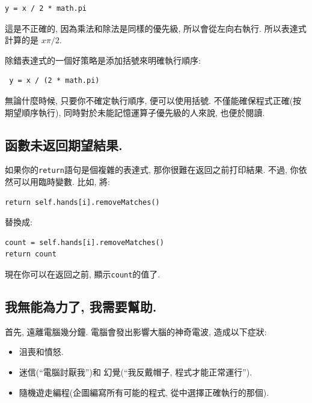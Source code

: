 \documentclass[10pt]{book}
\begin{document}
\begin{verbatim}
y = x / 2 * math.pi
\end{verbatim}
%
這是不正確的, 因為乘法和除法是同樣的優先級, 所以會從左向右執行. 
所以表達式計算的是 $x \pi / 2$.

除錯表達式的一個好策略是添加括號來明確執行順序:

\begin{verbatim}
 y = x / (2 * math.pi)
\end{verbatim}
%
無論什麼時候, 只要你不確定執行順序, 便可以使用括號. 
不僅能確保程式正確(按期望順序執行), 同時對於未能記憶運算子優先級的人來說, 
也便於閱讀. 


\subsection{函數未返回期望結果.}

如果你的{\tt return}語句是個複雜的表達式, 
那你很難在返回之前打印結果. 
不過, 你依然可以用臨時變數. 
比如, 將:

\begin{verbatim}
return self.hands[i].removeMatches()
\end{verbatim}
%
替換成:

\begin{verbatim}
count = self.hands[i].removeMatches()
return count
\end{verbatim}
%
現在你可以在返回之前, 顯示{\tt count}的值了.


\subsection{我無能為力了, 我需要幫助.}

首先, 遠離電腦幾分鐘. 
電腦會發出影響大腦的神奇電波, 造成以下症狀:

\begin{itemize}

\item 沮喪和憤怒.

\item 迷信(``電腦討厭我'')和
幻覺(``我反戴帽子, 程式才能正常運行'').

\item 隨機遊走編程(企圖編寫所有可能的程式, 從中選擇正確執行的那個).

\end{itemize}
\end{document}

